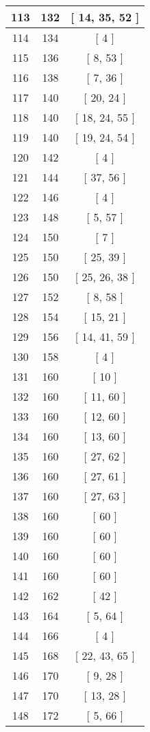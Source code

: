 \begin{center}
\begin{longtable}[H]{|| c c c ||}
\\\hline
113 & 132 & [ 14, 35, 52 ]
\\\hline
114 & 134 & [ 4 ]
\\\hline
115 & 136 & [ 8, 53 ]
\\\hline
116 & 138 & [ 7, 36 ]
\\\hline
117 & 140 & [ 20, 24 ]
\\\hline
118 & 140 & [ 18, 24, 55 ]
\\\hline
119 & 140 & [ 19, 24, 54 ]
\\\hline
120 & 142 & [ 4 ]
\\\hline
121 & 144 & [ 37, 56 ]
\\\hline
122 & 146 & [ 4 ]
\\\hline
123 & 148 & [ 5, 57 ]
\\\hline
124 & 150 & [ 7 ]
\\\hline
125 & 150 & [ 25, 39 ]
\\\hline
126 & 150 & [ 25, 26, 38 ]
\\\hline
127 & 152 & [ 8, 58 ]
\\\hline
128 & 154 & [ 15, 21 ]
\\\hline
129 & 156 & [ 14, 41, 59 ]
\\\hline
130 & 158 & [ 4 ]
\\\hline
131 & 160 & [ 10 ]
\\\hline
132 & 160 & [ 11, 60 ]
\\\hline
133 & 160 & [ 12, 60 ]
\\\hline
134 & 160 & [ 13, 60 ]
\\\hline
135 & 160 & [ 27, 62 ]
\\\hline
136 & 160 & [ 27, 61 ]
\\\hline
137 & 160 & [ 27, 63 ]
\\\hline
138 & 160 & [ 60 ]
\\\hline
139 & 160 & [ 60 ]
\\\hline
140 & 160 & [ 60 ]
\\\hline
141 & 160 & [ 60 ]
\\\hline
142 & 162 & [ 42 ]
\\\hline
143 & 164 & [ 5, 64 ]
\\\hline
144 & 166 & [ 4 ]
\\\hline
145 & 168 & [ 22, 43, 65 ]
\\\hline
146 & 170 & [ 9, 28 ]
\\\hline
147 & 170 & [ 13, 28 ]
\\\hline
148 & 172 & [ 5, 66 ]
\\\hline

\end{longtable}
\end{center}

